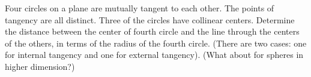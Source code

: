 Four circles on a plane are mutually tangent to each other.
The points of tangency are all distinct.
Three of the circles have collinear centers.
Determine the distance between the center of fourth circle
and the line through the centers of the others,
in terms of the radius of the fourth circle.\newline
(There are two cases: one for internal tangency and one for external tangency).\newline
(What about for spheres in higher dimension?)
